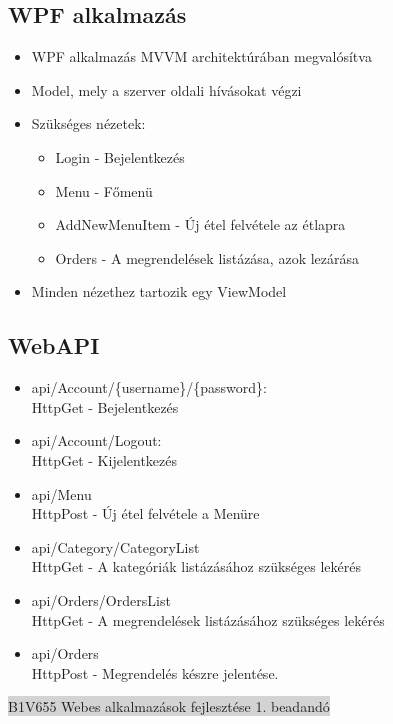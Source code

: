 \documentclass[11pt,a4paper]{article}
\begin{document}
\subsection{WPF alkalmazás}
\begin{itemize}
	\item WPF alkalmazás MVVM architektúrában megvalósítva
	\item Model, mely a szerver oldali hívásokat végzi
	\item Szükséges nézetek:
	\begin{itemize}
		\item Login - Bejelentkezés
		\item Menu - Főmenü
		\item AddNewMenuItem - Új étel felvétele az étlapra
		\item Orders - A megrendelések listázása, azok lezárása
	\end{itemize}
	\item Minden nézethez tartozik egy ViewModel
\end{itemize}
		
\subsection{WebAPI}
\begin{itemize}
	\item api/Account/\{username\}/\{password\}:\\[0.1cm]
	HttpGet - Bejelentkezés
	\item api/Account/Logout:\\[0.1cm]
	HttpGet - Kijelentkezés
	\item api/Menu\\[0.1cm]
	HttpPost - Új étel felvétele a Menüre
	\item api/Category/CategoryList\\[0.1cm]
	HttpGet - A kategóriák listázásához szükséges lekérés
	\item api/Orders/OrdersList\\[0.1cm]
	HttpGet - A megrendelések listázásához szükséges lekérés
	\item api/Orders\\[0.1cm]
	HttpPost - Megrendelés készre jelentése.
\end{itemize}

\newpage
\thispagestyle{empty}
\begin{center}
	\colorbox{lightgray}{{\large B1V655} \hspace{3cm} {\large Webes alkalmazások fejlesztése 1. beadandó} \hspace{5cm} \thepage}
\end{center}
\end{document}
